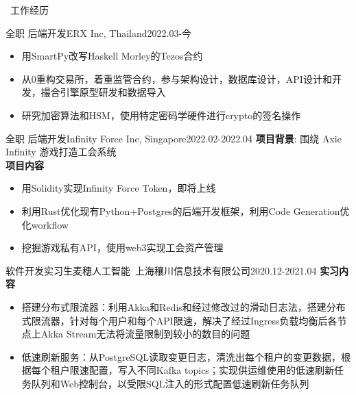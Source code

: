 \documentclass[UTF8]{resume}
\begin{document}
\begin{rSection}{\faBriefcase~工作经历}
\begin{rExperience}{全职 后端开发}{ERX Inc, Thailand}{2022.03-今}
\begin{itemize}
            \itemsep -0.5em \vspace{-0.5em}
            \item 用SmartPy改写Haskell Morley的Tezos合约
            \item 从0重构交易所，着重监管合约，参与架构设计，数据库设计，API设计和开发，撮合引擎原型研发和数据导入
            \item 研究加密算法和HSM，使用特定密码学硬件进行crypto的签名操作
        \end{itemize}
    \end{rExperience}
    \begin{rExperience}{全职 后端开发}{Infinity Force Inc, Singapore}{2022.02-2022.04}
        \textbf{项目背景}:
        围绕 Axie Infinity 游戏打造工会系统\\
        \textbf{项目内容}
        \begin{itemize}
            \itemsep -0.5em \vspace{-0.5em}
            \item 用Solidity实现Infinity Force Token，即将上线
            \item 利用Rust优化现有Python+Postgres的后端开发框架，利用Code Generation优化workflow
            \item 挖掘游戏私有API，使用web3实现工会资产管理
        \end{itemize}
    \end{rExperience}
    \begin{rExperience}{软件开发实习生}{麦穗人工智能~上海穰川信息技术有限公司}{2020.12-2021.04}
        \textbf{实习内容}
        \begin{itemize}
            \itemsep -0.5em \vspace{-0.5em}
            \item 搭建分布式限流器：利用Akka和Redis和经过修改过的滑动日志法，搭建分布式限流器，针对每个用户和每个API限速，解决了经过Ingress负载均衡后各节点上Akka Stream无法将流量限制到较小的数目的问题
            \item 低速刷新服务：从PostgreSQL读取变更日志，清洗出每个租户的变更数据，根据每个租户限速配置，写入不同Kafka topics；实现供运维使用的低速刷新任务队列和Web控制台，以受限SQL注入的形式配置低速刷新任务队列

\end{itemize}
\end{rExperience}
\end{rSection}
\end{document}
